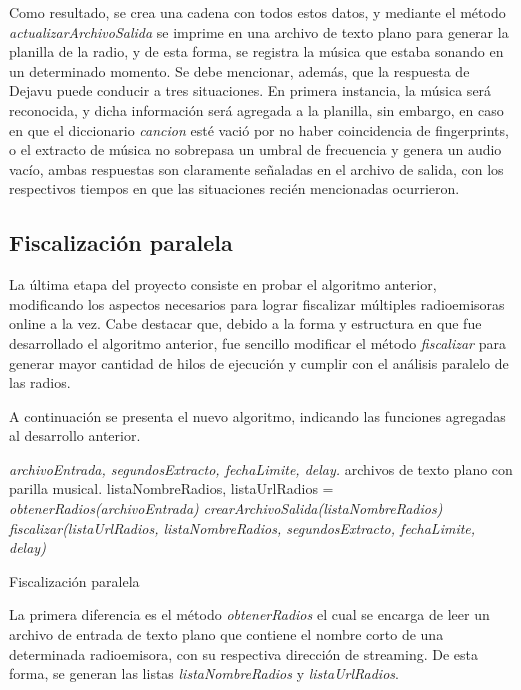 Como resultado, se crea una cadena con todos estos datos, y mediante el método \textit{actualizarArchivoSalida} se imprime en una archivo de texto plano para generar la planilla de la radio, y de esta forma, se registra la música que estaba sonando en un determinado momento. Se debe mencionar, además, que la respuesta de Dejavu puede conducir a tres situaciones. En primera instancia, la música será reconocida, y dicha información será agregada a la planilla, sin embargo, en caso en que el diccionario \textit{cancion} esté vació por no haber coincidencia de fingerprints, o el extracto de música no sobrepasa un umbral de frecuencia y genera un audio vacío, ambas respuestas son claramente señaladas en el archivo de salida, con los respectivos tiempos en que las situaciones recién mencionadas ocurrieron.


\subsection{Fiscalización paralela}
La última etapa del proyecto consiste en probar el algoritmo anterior, modificando los aspectos necesarios para lograr fiscalizar múltiples radioemisoras online a la vez. Cabe destacar que, debido a la forma y estructura en que fue desarrollado el algoritmo anterior, fue sencillo modificar el método \textit{fiscalizar} para generar mayor cantidad de hilos de ejecución y cumplir con el análisis paralelo de las radios.

A continuación se presenta el nuevo algoritmo, indicando las funciones agregadas al desarrollo anterior.


\begin{algorithm}
\begin{algorithmic}[1]
\REQUIRE \textit{archivoEntrada, segundosExtracto, fechaLimite, delay.}
\ENSURE archivos de texto plano con parilla musical.
\STATE listaNombreRadios, listaUrlRadios = \textit{obtenerRadios(archivoEntrada)}
\STATE \textit{crearArchivoSalida(listaNombreRadios)}
\STATE \textit{fiscalizar(listaUrlRadios, listaNombreRadios, segundosExtracto, fechaLimite, delay)}

\end{algorithmic}
\caption{Fiscalización paralela}\label{alg:fiscalizarParalelo}
\end{algorithm}

La primera diferencia es el método \textit{obtenerRadios} el cual se encarga de leer un archivo de entrada de texto plano que contiene el nombre corto de una determinada radioemisora, con su respectiva dirección de streaming. De esta forma, se generan las listas \textit{listaNombreRadios} y \textit{listaUrlRadios}.

